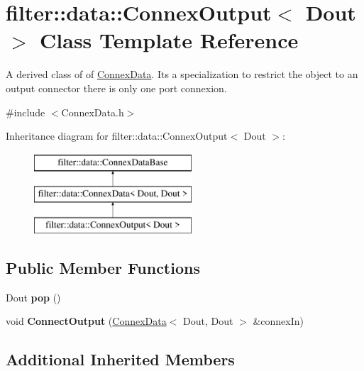 \hypertarget{classfilter_1_1data_1_1_connex_output}{}\section{filter\+:\+:data\+:\+:Connex\+Output$<$ Dout $>$ Class Template Reference}
\label{classfilter_1_1data_1_1_connex_output}


A derived class of of \hyperlink{classfilter_1_1data_1_1_connex_data}{Connex\+Data}. It\textquotesingle{}s a specialization to restrict the object to an output connector there is only one port connexion.  




{\ttfamily \#include $<$Connex\+Data.\+h$>$}

Inheritance diagram for filter\+:\+:data\+:\+:Connex\+Output$<$ Dout $>$\+:\begin{figure}[H]
\begin{center}
\leavevmode
\includegraphics[height=3.000000cm]{d6/ddc/classfilter_1_1data_1_1_connex_output}
\end{center}
\end{figure}
\subsection*{Public Member Functions}
\begin{DoxyCompactItemize}
\item 
\mbox{\label{classfilter_1_1data_1_1_connex_output_a343d811aad79aff050e4e2e0a97d0a53}} 
Dout {\bfseries pop} ()
\item 
\mbox{\label{classfilter_1_1data_1_1_connex_output_ac0cfae1835db1de96a59678551f29f8c}} 
void {\bfseries Connect\+Output} (\hyperlink{classfilter_1_1data_1_1_connex_data}{Connex\+Data}$<$ Dout, Dout $>$ \&connex\+In)
\end{DoxyCompactItemize}
\subsection*{Additional Inherited Members}


